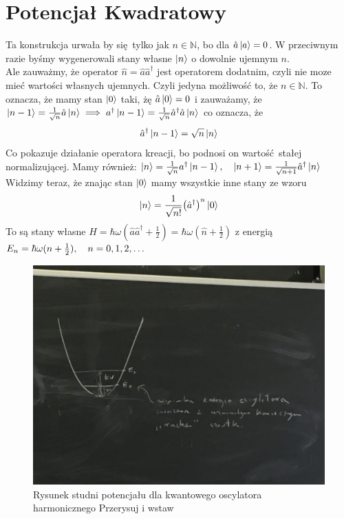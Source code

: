 \documentclass[12pt,a4paper]{report}
\newcommand{\com}[1]{{\color{red} #1}}
\newenvironment{lecture}[1]{\par\medskip
   \noindent\chapter{#1} \rmfamily}{\medskip}
\begin{document}
\begin{lecture}{Potencjał Kwadratowy}
    Ta konstrukcja urwała by się tylko jak $n \in \mathbb{N}$, bo dla $\hat{a}\ket{a} = 0$. W przeciwnym razie byśmy wygenerowali stany własne $\ket{n}$ o dowolnie ujemnym $n$.\\
    Ale zauważmy, że operator $\hat{n} = \hat{a}\hat{a}^\dagger$ jest operatorem dodatnim, czyli nie moze mieć wartości własnych ujemnych. Czyli jedyna możliwość to, że $n\in\mathbb{N}$. To oznacza, że mamy stan $\ket{0}$ taki, żę $\hat{a}\ket{0} = 0$ i zauważamy, że $\ket{n-1} = \frac{1}{\sqrt{n}} \hat{a} \ket{n} \implies a^\dagger\ket{n-1} = \frac{1}{\sqrt{n}} \hat{a}^\dagger \hat{a} \ket{n}$ co oznacza, że
    \[
        \hat{a}^\dagger \ket{n-1} = \sqrt{n}\ket{n}
    \]
    Co pokazuje działanie operatora kreacji, bo podnosi on wartość stałej normalizującej. Mamy również: $\ket{n} = \frac{1}{\sqrt{n}} a^\dagger \ket{n-1}\qc\ket{n+1} = \frac{1}{\sqrt{n+1}} \hat{a}^\dagger \ket{n}$\\
    Widzimy teraz, że znając stan $\ket{0}$ mamy wszystkie inne stany ze wzoru 
    \[
    \ket{n} = \frac{1}{\sqrt{n!}} \qty(\hat{a}^\dagger)^n\ket{0}
    \]
    To są stany własne $\hat{H} = \hbar \omega (\hat{a}\hat{a}^\dagger + \frac12) = \hbar \omega (\hat{n} + \frac12)$ z energią $E_n = \hbar \omega (n + \frac12)\qc n = 0, 1, 2, \dots$\\
    \begin{figure}[!ht]
        \centering
        \includegraphics[width=\linewidth]{Wyk_9_Rys_1.JPG}
        \caption{Rysunek studni potencjału dla kwantowego oscylatora harmonicznego \com{Przerysuj i wstaw}}
        \label{fig:lec_9:studnia_osc}
    \end{figure}

\end{lecture}
\end{document}
